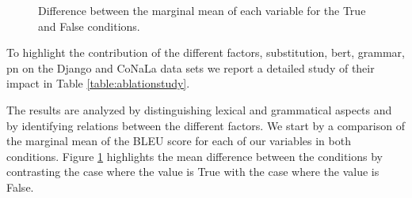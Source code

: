 \documentclass[11pt]{article}
\newcommand{\comment}[1]{}
\newcommand{\var}{\sc}
\begin{document}
\begin{figure}[htbp]
\caption{Difference between the marginal mean of each variable for the {\var True} and {\var False} conditions. }
\label{fig:margmean}
\end{figure}


To  highlight the contribution of the different factors, {\sc substitution, bert, grammar, pn} on the  {\selectfont Django} and {\selectfont CoNaLa} data sets
we report a detailed study of their impact in Table \ref{table:ablationstudy}.

The results are analyzed by distinguishing lexical and grammatical aspects and by identifying relations between the different factors. We start by a comparison of the marginal mean of the BLEU score for each of our variables in both conditions. Figure \ref{fig:margmean} highlights the mean difference between the conditions by contrasting the case where the value is {\sc True} with the case where the value is {\sc False}.


\comment{
\begin{figure}[htbp]
\begin{tikzpicture}
\begin{axis}[
    symbolic x coords={substitution, BERT, grammar, pointernet},
    xtick=data,ylabel=BLEU, ybar,height=7cm,width=8cm]
    \addplot[ybar,fill=blue] coordinates {
        (substitution,9.13)
        (BERT,5.78)
        (grammar,-0.91)
        (pointernet,1.1)
    };
    \addplot[ybar,fill=red] coordinates {
        (substitution,20.41)
        (BERT,2.83)
        (grammar,-1.73)
        (pointernet,6.47)
    };
\legend{CoNaLa, Django}
\end{axis}
\end{tikzpicture}
\caption{Difference between the marginal mean of each variables set to True and False. {\it la légende est dégueu je sais pas comment tourner ça}}
\label{fig:margmean}
\end{figure}
\\}
\end{document}
